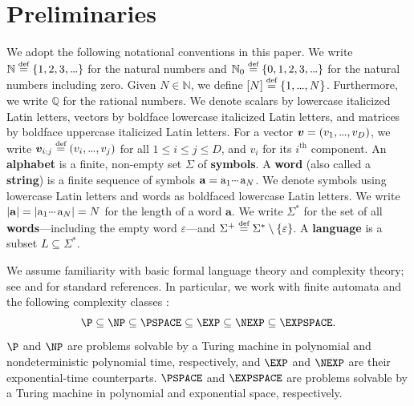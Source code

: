 \documentclass{article} %
\newcommand{\Q}{\mathbb{Q}}
\newcommand{\N}{\mathbb{N}}
\newcommand{\defeq}{\mathrel{\stackrel{\textnormal{\tiny def}}{=}}}
\newcommand{\defn}[1]{\textbf{#1}}
\newcommand{\sym}[1]{\mathrm{#1}}
\newcommand{\str}[1]{#1}
\newcommand{\alphabet}{\Sigma}
\newcommand{\bv}{\boldsymbol{v}}
\newcommand{\vsub}[2]{\bv_{#1:#2}}
\newcommand{\bword}{\mathbf{a}}
\newcommand{\Lang}{L}
\newcommand{\mydots}{%
  \ifmmode
    \mathord{.}\mkern-1mu\mathord{.}\mkern-1mu\mathord{.}%
  \else
    .\kern-0.1em.\kern-0.1em.%
  \fi
}
\newcommand{\mycdots}{%
  \ifmmode
    \mathord{\raisebox{0.45ex}{\ensuremath{\mydots}}}\mkern2mu%
  \else
    \raisebox{0.45ex}{.\kern-0.1em.\kern-0.1em.}\kern0.1em%
  \fi
}
\renewcommand{\cdots}{\mycdots}%
\renewcommand{\ldots}{\mydots}%
\begin{document}
\section{Preliminaries}
\label{sec:prelim}
We adopt the following notational conventions in this paper.
We write $\N \defeq \{1, 2, 3, \ldots\}$ for the natural numbers and $\N_0 \defeq \{0, 1, 2, 3, \ldots\}$ for the natural numbers including zero.
Given $N \in \N$, we define $[N] \defeq \{1, \ldots, N\}$.
Furthermore, we write $\Q$ for the rational numbers.
We denote scalars by lowercase italicized Latin letters, vectors by boldface lowercase italicized Latin letters, and matrices by boldface uppercase italicized Latin letters.
For a vector $\bv =
(v_1,\ldots,v_D)$, we write $\vsub{i}{j} \defeq (v_i,\ldots,v_j)$ for all $1
\le i \le j \le D$, and $v_i$ for its $i^{\text{th}}$ component.
An \defn{alphabet} is a finite, non-empty set $\alphabet$ of \defn{symbols}.
A \defn{word} (also called a \defn{string}) is a finite sequence of symbols $\str{\bword} = \sym{a}_1\cdots \sym{a}_N$.
We denote symbols using lowercase Latin letters and words as boldfaced lowercase Latin letters.
We write $|\str{\mathbf{a}}| = |\sym{a}_1\cdots \sym{a}_N| = N$ for the length of a word $\str{\mathbf{a}}$.
We write $\alphabet^*$ for the set of all \defn{words}---including the empty word $\varepsilon$---and $\alphabet^+ \defeq \alphabet^* \setminus \{\varepsilon\}$.
A \defn{language} is a subset $\Lang \subseteq \alphabet^*$.

We assume familiarity with basic formal language theory and complexity
theory; see \citet{Kozen} and \citet{Sipser97} for standard references.
In particular, we work with finite automata and the following complexity
classes \citep{Sipser97}:
\[
    \P \subseteq \NP \subseteq \PSPACE \subseteq \EXP \subseteq \NEXP
    \subseteq \EXPSPACE.
\]
$\P$ and $\NP$ are problems solvable by a Turing machine in polynomial and
nondeterministic polynomial time, respectively, and $\EXP$ and $\NEXP$
are their exponential-time counterparts. $\PSPACE$ and $\EXPSPACE$ are
problems solvable by a Turing machine in polynomial and exponential space, respectively.
\end{document}
